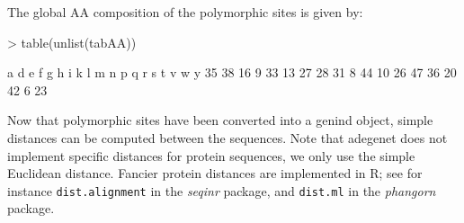 \documentclass{article}
\begin{document}
The global AA composition of the polymorphic sites is given by:
\begin{Schunk}
\begin{Sinput}
> table(unlist(tabAA))
\end{Sinput}
\begin{Soutput}
 a  d  e  f  g  h  i  k  l  m  n  p  q  r  s  t  v  w  y 
35 38 16  9 33 13 27 28 31  8 44 10 26 47 36 20 42  6 23 
\end{Soutput}
\end{Schunk}

Now that polymorphic sites have been converted into a genind object, simple distances can be
computed between the sequences.
Note that adegenet does not implement specific distances for protein sequences, we only use the
simple Euclidean distance.
Fancier protein distances are implemented in R; see for instance \texttt{dist.alignment} in the
\emph{seqinr} package, and \texttt{dist.ml} in the \emph{phangorn} package.
\end{document}
